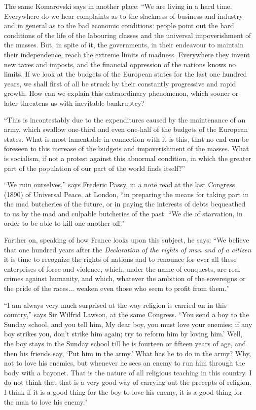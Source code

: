 \documentclass{book}
\begin{document}
The same Komarovski says in another place: “We are living in a hard time. Everywhere do we hear complaints as to the slackness of business and industry and in general as to the bad economic conditions: people point out the hard conditions of the life of the labouring classes and the universal impoverishment of the masses. But, in spite of it, the governments, in their endeavour to maintain their independence, reach the extreme limits of madness. Everywhere they invent new taxes and imposts, and the financial oppression of the nations knows no limits. If we look at the budgets of the European states for the last one hundred years, we shall first of all be struck by their constantly progressive and rapid growth. How can we explain this extraordinary phenomenon, which sooner or later threatens us with inevitable bankruptcy?

“This is incontestably due to the expenditures caused by the maintenance of an army, which swallow one-third and even one-half of the budgets of the European states. What is most lamentable in connection with it is this, that no end can be foreseen to this increase of the budgets and impoverishment of the masses. What is socialism, if not a protest against this abnormal condition, in which the greater part of the population of our part of the world finds itself?”

“We ruin ourselves,” says Frederic Passy, in a note read at the last Congress (1890) of Universal Peace, at London, “in preparing the means for taking part in the mad butcheries of the future, or in paying the interests of debts bequeathed to us by the mad and culpable butcheries of the past. “We die of starvation, in order to be able to kill one another off.”

Farther on, speaking of how France looks upon this subject, he says: “We believe that one hundred years after the \emph{Declaration of the rights of man and of a citizen} it is time to recognize the rights of nations and to renounce for ever all these enterprises of force and violence, which, under the name of conquests, are real crimes against humanity, and which, whatever the ambition of the sovereigns or the pride of the races... weaken even those who seem to profit from them."

“I am always very much surprised at the way religion is carried on in this country,” says Sir Wilfrid Lawson, at the same Congress. “You send a boy to the Sunday school, and you tell him, My dear boy, you must love your enemies; if any boy strikes you, don’t strike him again; try to reform him by loving him.’ Well, the boy stays in the Sunday school till he is fourteen or fifteen years of age, and then his friends say, ‘Put him in the army.’ What has he to do in the army? Why, not to love his enemies, but whenever he sees an enemy to run him through the body with a bayonet. That is the nature of all religious teaching in this country. I do not think that that is a very good way of carrying out the precepts of religion. I think if it is a good thing for the boy to love his enemy, it is a good thing for the man to love his enemy.”
\end{document}
